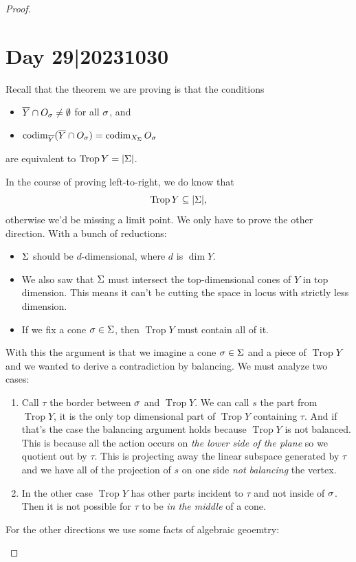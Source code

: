 \documentclass[12pt]{memoir}
\DeclareMathOperator{\Trop}{Trop}
\theoremstyle{definition}
\begin{document}
\begin{proof}
\section{Day 29|20231030}

Recall that the theorem we are proving is that the conditions
\begin{itemize}
    \item $\overline Y\cap O_\sigma\neq \emptyset$  for all $\sigma$, and
    \item $\operatorname{codim}_{\overline Y}(\overline Y\cap O_\sigma)=\operatorname{codim}_{X_\Sigma} O_\sigma$
\end{itemize}
are equivalent to $\Trop Y=|\Sg|$.\par 
In the course of proving left-to-right, we do know that 
$$\Trop Y\subseteq |\Sg|,$$
otherwise we'd be missing a limit point. We only have to prove the other direction. With a bunch of reductions:
\begin{itemize}
    \item $\Sigma$ should be $d$-dimensional, where $d$ is $\dim Y$.
    \item We also saw that $\Sigma$ must intersect the top-dimensional cones of $Y$ in top dimension. This means it can't be cutting the space in locus with strictly less dimension.
    \item If we fix a cone $\sigma\in\Sigma$, then $\Trop Y$ must contain all of it.
\end{itemize}
With this the argument is that we imagine a cone $\sigma\in\Sigma$ and a piece of $\Trop Y$ and we wanted to derive a contradiction by balancing. We must analyze two cases:
\begin{enumerate}
    \item Call $\tau$ the border between $\sigma$ and $\Trop Y$. We can call $s$ the part from $\Trop Y$, it is the only top dimensional part of $\Trop Y$ containing $\tau$. And if that's the case the balancing argument holds because 
    $\Trop Y$ is not balanced. This is because all the action occurs on \emph{the lower side of the plane} so we quotient out by $\tau$. This is projecting away the linear subspace generated by $\tau$ and we have all of the projection of $s$ on one side \emph{not balancing} the vertex.
    \item In the other case $\Trop Y$ has other parts incident to $\tau$ and not inside of $\sigma$. Then it is not possible for $\tau$ to be \emph{in the middle} of a cone. 
\end{enumerate}
For the other directions we use some facts of algebraic geoemtry:
\begin{itemize}

\end{itemize}
\end{proof}
\end{document}
